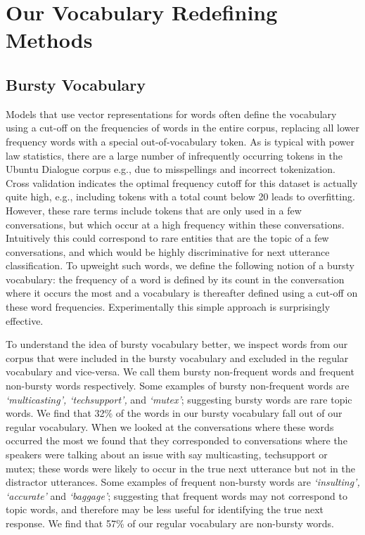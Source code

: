 \documentclass[11pt]{report}
\begin{document}
\section{Our Vocabulary Redefining Methods}\label{our_methods}

\subsection{Bursty Vocabulary}\label{bursty_vocabulary}

Models that use vector representations for words often define the vocabulary using a cut-off on the frequencies of words in the entire corpus, replacing all lower frequency words with a special out-of-vocabulary token. As is typical with power law statistics, there are a large number of infrequently occurring tokens in the Ubuntu Dialogue corpus e.g., due to misspellings and incorrect tokenization.  Cross validation indicates the optimal frequency cutoff for this dataset is actually quite high, e.g., including tokens with a total count below 20 leads to overfitting. 
However, these rare terms include tokens that are only used in a few conversations, but which occur at a high frequency within these conversations.  Intuitively this could correspond to rare entities that are the topic of a few conversations, and which would be  highly discriminative for next utterance classification. To upweight such words, we define the following notion of a bursty vocabulary: the frequency of a word is defined by its count in the conversation where it occurs the most and a vocabulary is thereafter defined using a cut-off on these word frequencies.  Experimentally this simple approach is surprisingly effective.

To understand the idea of bursty vocabulary better, we inspect words from our corpus that were included in the bursty vocabulary and excluded in the regular vocabulary and vice-versa. We call them bursty non-frequent words and frequent non-bursty words respectively. Some examples of bursty non-frequent words are \textit{`multicasting', `techsupport',} and  \textit{`mutex'}; suggesting bursty words are rare topic words. We find that 32\% of the words in our bursty vocabulary fall out of our regular vocabulary.
When we looked at the conversations where these words occurred the most we found that they corresponded to conversations where the speakers were talking about an issue with say multicasting, techsupport or mutex; these words were likely to occur in the true next utterance but not in the distractor utterances.
Some examples of frequent non-bursty words are \textit{`insulting', `accurate'} and \textit{`baggage'}; suggesting that frequent words may not correspond to topic words, and therefore may be less useful for identifying the true next response. We find that 57\% of our regular vocabulary are non-bursty words.
\end{document}
